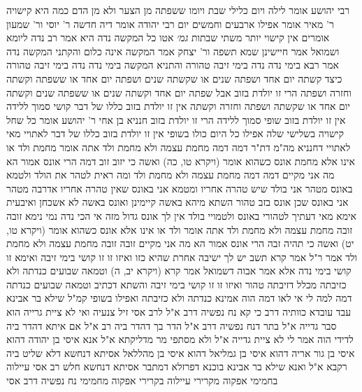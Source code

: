 \documentclass[12pt, openany]{book}
\begin{document}
{רבי יהושע אומר  לילה ויום כלילי שבת ויומו  ששפתה מן הצער ולא מן הדם 
כמה היא קישויה  ר' מאיר אומר  אפילו ארבעים וחמשים יום  רבי יהודה אומר  דיה חדשה  ר' יוסי ור' שמעון אומרים  אין קישוי יותר משתי שבתות
{\large\emph{גמ׳}} אטו כל המקשה נדה היא
אמר רב  נדה ליומא  ושמואל אמר  חיישינן שמא תשפה 
ור' יצחק אמר  המקשה אינה כלום  והקתני המקשה נדה 
אמר רבא  בימי נדה נדה בימי זיבה טהורה  והתניא המקשה בימי נדה נדה בימי זיבה טהורה 
כיצד קשתה יום אחד ושפתה שנים או שקשתה שנים ושפתה יום אחד או ששפתה וקשתה וחזרה ושפתה הרי זו יולדת בזוב 
אבל שפתה יום אחד וקשתה שנים או ששפתה שנים וקשתה יום אחד או שקשתה ושפתה וחזרה וקשתה אין זו יולדת בזוב  כללו של דבר  קושי סמוך ללידה אין זו יולדת בזוב שופי סמוך ללידה הרי זו יולדת בזוב 
חנניא בן אחי ר' יהושע אומר  כל שחל קישויה בשלישי שלה אפילו כל היום כולו בשופי אין זו יולדת בזוב 
כללו של דבר לאתויי מאי  לאתויי דחנניא 
מה"מ  דת"ר  דמה דמה מחמת עצמה ולא מחמת ולד 
אתה אומר מחמת ולד או אינו אלא מחמת אונס  כשהוא אומר (ויקרא טו, כה) ואשה כי יזוב זוב דמה הרי אונס אמור הא מה אני מקיים דמה  דמה מחמת עצמה ולא מחמת ולד 
ומה ראית לטהר את הולד ולטמא באונס  מטהר אני בולד שיש טהרה אחריו ומטמא אני באונס שאין טהרה אחריו 
אדרבה מטהר אני באונס שכן אונס בזב טהור  השתא מיהא באשה קיימינן ואונס באשה לא אשכחן 
ואיבעית אימא  מאי דעתיך לטהורי באונס ולטמויי בולד  אין לך אונס גדול מזה 
אי הכי נדה נמי נימא זובה זובה מחמת עצמה ולא מחמת ולד 
אתה אומר ולד או אינו אלא אונס  כשהוא אומר (ויקרא טו, יט) ואשה כי תהיה זבה הרי אונס אמור הא מה אני מקיים זובה זובה מחמת עצמה ולא מחמת ולד 
אמר ר"ל  אמר קרא תשב יש לך ישיבה אחרת שהיא כזו ואיזו זו זו קושי בימי זיבה  ואימא  זו קושי בימי נדה 
אלא אמר אבוה דשמואל  אמר קרא (ויקרא יב, ה) וטמאה שבועים כנדתה ולא כזיבתה מכלל דזיבתה טהור ואיזו זו זו קושי בימי זיבה 
והשתא דכתיב וטמאה שבועים כנדתה דמה למה לי  אי לאו דמה הוה אמינא כנדתה ולא כזיבתה ואפילו בשופי קמ"ל 
שילא בר אבינא עבד עובדא כוותיה דרב  כי קא נח נפשיה דרב א"ל לרב אסי  זיל צנעיה ואי לא ציית גרייה  הוא סבר גדייה א"ל 
בתר דנח נפשיה דרב א"ל  הדר בך  דהדר ביה רב  א"ל  אם איתא דהדר ביה לדידי הוה אמר לי  לא ציית  גדייה  א"ל  ולא מסתפי מר מדליקתא 
א"ל  אנא איסי בן יהודה דהוא איסי בן גור אריה דהוא איסי בן גמליאל דהוא איסי בן מהללאל אסיתא דנחשא דלא שליט ביה רקבא  א"ל  ואנא שילא בר אבינא בוכנא דפרזלא דמתבר אסיתא דנחשא 
חלש רב אסי  עיילוה בחמימי אפקוה מקרירי עיילוה בקרירי אפקוה מחמימי נח נפשיה דרב אסי}
\end{document}
